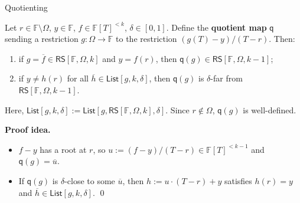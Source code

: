 \documentclass{zkdl-presentation-template}
\begin{document}
    \begin{frame}{Quotienting}
        \begin{proposition}[Quotienting]
            Let $r \in \mathbb{F} \setminus \Omega$, $y \in \mathbb{F}$, $f \in \mathbb{F}[T]^{<k}$, $\delta \in [0,1]$. Define the \textbf{quotient map} $\mathsf{q}$ sending a restriction $g: \Omega \to \mathbb{F}$ to the restriction $(g(T)-y)/(T-r)$. Then:
            \begin{enumerate}
                \item if $g = \overline{f} \in \mathsf{RS}[\mathbb{F}, \Omega, k]$ and $y=f(r)$, then $\mathsf{q}(g) \in \mathsf{RS}[\mathbb{F},\Omega,k-1]$;
                \item if $y \neq h(r)$ for all $\overline{h} \in \mathsf{List}[g,k,\delta]$, then $\mathsf{q}(g)$ is $\delta$-far from $\mathsf{RS}[\mathbb{F},\Omega,k-1]$.
            \end{enumerate}
        \end{proposition}
        Here, $\mathsf{List}[g,k,\delta] := \mathsf{List}[g,\mathsf{RS}[\mathbb{F},\Omega,k],\delta]$. Since $r \notin \Omega$, $\mathsf{q}(g)$ is well-defined.
        \pause

        \textbf{Proof idea.}
        \begin{itemize}
            \item[(i)] $f - y$ has a root at $r$, so $u := (f - y)/(T - r) \in \mathbb{F}[T]^{<k-1}$ and $\mathsf{q}(g) = \overline{u}$.\pause
            \item[(ii)] If $\mathsf{q}(g)$ is $\delta$-close to some $\overline{u}$, then $h := u \cdot (T - r) + y$ satisfies $h(r) = y$ and $\overline{h} \in \mathsf{List}[g, k, \delta]$. \qed
        \end{itemize}
    \end{frame}
\end{document}
